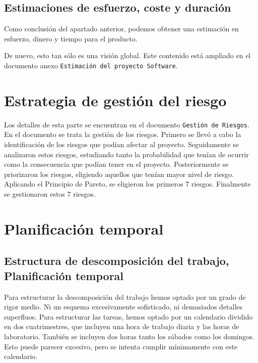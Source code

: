 \documentclass[spanish,a4paper,12pt]{report}	%
\begin{document}
	\section{Estimaciones de esfuerzo, coste y duración}
		Como conclusión del apartado anterior, podemos obtener una estimación en esfuerzo, dinero y tiempo para el producto.


		De nuevo, esto tan sólo es una visión global. Este contenido está ampliado en el
		documento anexo \texttt{Estimación del proyecto Software}.


\newpage
\mbox{}
\thispagestyle{empty}						%
\newpage
\setcounter{section}{0}

\chapter{Estrategia de gestión del riesgo}

	Los detalles de esta parte se encuentran en el documento \texttt{Gestión de Riesgos}.\\
	En el documento se trata la gestión de los riesgos. Primero se llevó a cabo la identificación de los riesgos que podían afectar al proyecto.
	Seguidamente se analizaron estos riesgos, estudiando tanto la probabilidad que tenían de ocurrir como la consecuencia que podían 
	tener en el proyecto. Posteriormente se priorizaron los riesgos, eligiendo aquellos que tenían mayor nivel de riesgo. Aplicando el Principio de Pareto, 
	se eligieron los primeros 7 riesgos.
	Finalmente se gestionaron estos 7 riesgos.

\newpage
\mbox{}
\thispagestyle{empty}						%
\newpage
\setcounter{section}{0}

\chapter{Planificación temporal}

	\section{Estructura de descomposición del trabajo, Planificación temporal}
	Para estructurar la descomposición del trabajo hemos optado por un grado de rigor medio. Ni un esquema excesivamente sofisticado, ni demasiados detalles superfluos. 
	Para estructurar las tareas, hemos optado por un calendario dividido en dos cuatrimestres, que incluyen una hora de trabajo diaria y las horas de laboratorio. También se incluyen dos 
	horas tanto los sábados como los domingos. Esto puede parecer excesivo, pero se intenta cumplir mínimamente con este calendario.
\end{document}
